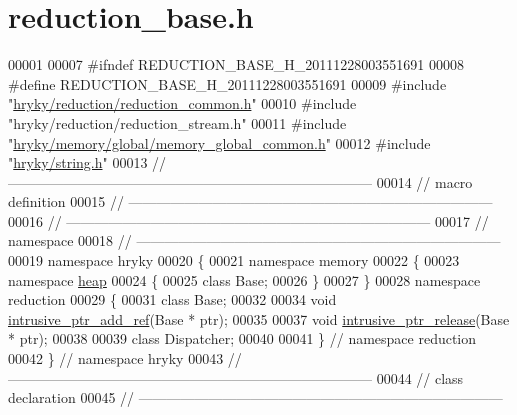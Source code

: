 \hypertarget{reduction__base_8h_source}{\section{reduction\-\_\-base.\-h}
}

\begin{DoxyCode}
00001 
00007 \textcolor{preprocessor}{#ifndef REDUCTION\_BASE\_H\_20111228003551691}
00008 \textcolor{preprocessor}{}\textcolor{preprocessor}{#define REDUCTION\_BASE\_H\_20111228003551691}
00009 \textcolor{preprocessor}{}\textcolor{preprocessor}{#include "\hyperlink{reduction__common_8h}{hryky/reduction/reduction_common.h}"}
00010 \textcolor{preprocessor}{#include "hryky/reduction/reduction\_stream.h"}
00011 \textcolor{preprocessor}{#include "\hyperlink{memory__global__common_8h}{hryky/memory/global/memory_global_common.h}"}
00012 \textcolor{preprocessor}{#include "\hyperlink{string_8h}{hryky/string.h}"}
00013 \textcolor{comment}{//
      ------------------------------------------------------------------------------}
00014 \textcolor{comment}{// macro definition}
00015 \textcolor{comment}{//
      ------------------------------------------------------------------------------}
00016 \textcolor{comment}{//
      ------------------------------------------------------------------------------}
00017 \textcolor{comment}{// namespace}
00018 \textcolor{comment}{//
      ------------------------------------------------------------------------------}
00019 \textcolor{keyword}{namespace }hryky
00020 \{
00021 \textcolor{keyword}{namespace }memory
00022 \{
00023 \textcolor{keyword}{namespace }\hyperlink{namespacehryky_1_1memory_1_1global_a6fc6103f67c837aa0f39b359588409cd}{heap}
00024 \{
00025     \textcolor{keyword}{class }Base;
00026 \}
00027 \}
00028 \textcolor{keyword}{namespace }reduction
00029 \{
00031     \textcolor{keyword}{class }Base;
00032 
00034     \textcolor{keywordtype}{void} \hyperlink{namespacehryky_1_1reduction_ab59dece4af8e91c10781e3b092c06d1b}{intrusive_ptr_add_ref}(Base * ptr);
00035 
00037     \textcolor{keywordtype}{void} \hyperlink{namespacehryky_1_1reduction_ab54d3281488314c37ed3906b45c8f866}{intrusive_ptr_release}(Base * ptr);
00038 
00039     \textcolor{keyword}{class }Dispatcher;
00040 
00041 \} \textcolor{comment}{// namespace reduction}
00042 \} \textcolor{comment}{// namespace hryky}
00043 \textcolor{comment}{//
      ------------------------------------------------------------------------------}
00044 \textcolor{comment}{// class declaration}
00045 \textcolor{comment}{//
      ------------------------------------------------------------------------------}

\end{DoxyCode}
